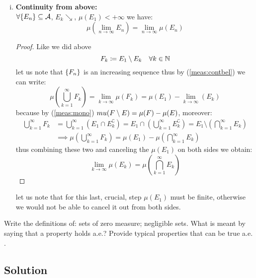\begin{enumerate}[i)]
    \item \label{meas:contab} \textbf{Continuity from above:} \\
    $\forall \{ E_n \} \subseteq \mathcal{A}$, $E_k\searrow$, $\mu(E_1) < +\infty$ we have:
    \[
        \mu\left( \lim_{n\to\infty} E_n \right) = \lim_{n\to\infty} \mu(E_n)
    \]
    \begin{proof}
    Like we did above 
    \[
            F_k \coloneqq E_1 \setminus E_k \quad \forall k \in\mathbb{N}
    \]
    let us note that $\{ F_n \}$ is an increasing sequence thus by (\ref{meas:contbel}) we can write:
    \[
        \mu\left( \bigcup_{k=1}^{\infty} F_k \right) = \lim_{k\to\infty} \mu(F_k) = \mu(E_1) - \lim_{k\to\infty}  (E_k)   
    \]
    because by (\ref*{meas:mono}) $\\mu(F \setminus E) = \mu(F)-\mu(E)$, moreover:
    \begin{align*}
        \bigcup_{k=1}^{\infty} F_k & = \bigcup_{k=1}^{\infty} (E_1\cap E_k^\complement) = E_1\cap \left( \bigcup_{k=1}^{\infty} E_k^\complement \right) = E_1 \setminus \left( \bigcap_{k=1}^{\infty} E_k \right) \\
        &\implies \mu\left( \bigcup_{k=1}^{\infty} F_k \right) = \mu(E_1) - \mu \left( \bigcap_{k=1}^{\infty} E_k \right)
    \end{align*}
    thus combining these two and canceling the $\mu(E_1)$ on both sides we obtain:
    \[
        \lim_{k\to\infty} \mu(E_k) = \mu \left( \bigcap_{k=1}^{\infty} E_k \right)
    \]
    \end{proof}
    let us note that for this last, crucial, step $\mu(E_1)$ must be finite, otherwise we would not be able to cancel it out from both sides.
\end{enumerate}


\question
Write the definitions of: sets of zero measure; negligible sets. What is meant by saying that a property holds a.e.? Provide typical properties that can be true a.e. .

\subsection*{Solution}

